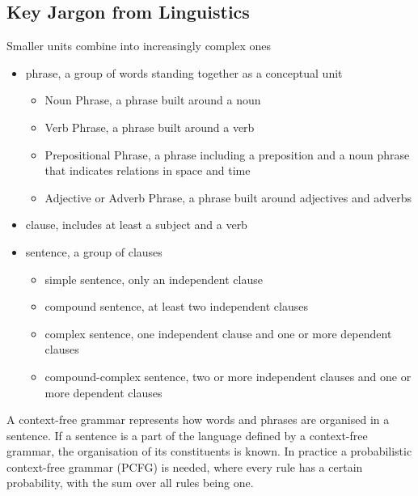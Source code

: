\documentclass[11pt]{article}
\begin{document}
\subsection{Key Jargon from Linguistics}
Smaller units combine into increasingly complex ones
\begin{itemize}
	\item phrase, a group of words standing together as a conceptual unit
	\begin{itemize}
		\item Noun Phrase, a phrase built around a noun
		\item Verb Phrase, a phrase built around a verb
		\item Prepositional Phrase, a phrase including a preposition and a noun phrase that indicates relations in space and time
		\item Adjective or Adverb Phrase, a phrase built around adjectives and adverbs
	\end{itemize}
	\item clause, includes at least a subject and a verb
	\item sentence, a group of clauses
	\begin{itemize}
		\item simple sentence, only an independent clause
		\item compound sentence, at least two independent clauses
		\item complex sentence, one  independent clause and one or more dependent clauses
		\item compound-complex sentence, two or more independent clauses and one or more dependent clauses
	\end{itemize}
\end{itemize}

A context-free grammar represents how words and phrases are organised in a sentence. If a sentence is a part of the language defined by a context-free grammar, the organisation of its constituents is known. In practice a probabilistic context-free grammar (PCFG) is needed, where every rule has a certain probability, with the sum over all rules being one.
\end{document}
